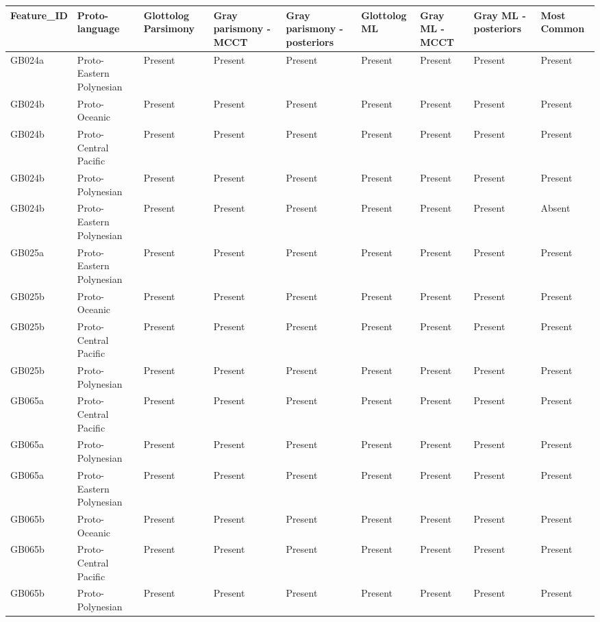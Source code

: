 \begin{longtable}{p{1.5cm}p{2.5cm}p{2.5cm}p{2.5cm}p{2.5cm}p{2.5cm}p{2.5cm}p{2.5cm}p{2.5cm}}
  \toprule
Feature\_ID & Proto-language & Glottolog Parsimony & Gray parismony -MCCT & Gray parismony -posteriors & Glottolog ML & Gray ML -MCCT & Gray ML -posteriors & Most Common \\ 
  \midrule
GB024a & Proto-Eastern Polynesian & Present & Present & Present & Present & Present & Present & Present \\ 
  GB024b & Proto-Oceanic & Present & Present & Present & Present & Present & Present & Present \\ 
  GB024b & Proto-Central Pacific & Present & Present & Present & Present & Present & Present & Present \\ 
  GB024b & Proto-Polynesian & Present & Present & Present & Present & Present & Present & Present \\ 
  GB024b & Proto-Eastern Polynesian & Present & Present & Present & Present & Present & Present & Absent \\ 
  GB025a & Proto-Eastern Polynesian & Present & Present & Present & Present & Present & Present & Present \\ 
  GB025b & Proto-Oceanic & Present & Present & Present & Present & Present & Present & Present \\ 
  GB025b & Proto-Central Pacific & Present & Present & Present & Present & Present & Present & Present \\ 
  GB025b & Proto-Polynesian & Present & Present & Present & Present & Present & Present & Present \\ 
  GB065a & Proto-Central Pacific & Present & Present & Present & Present & Present & Present & Present \\ 
  GB065a & Proto-Polynesian & Present & Present & Present & Present & Present & Present & Present \\ 
  GB065a & Proto-Eastern Polynesian & Present & Present & Present & Present & Present & Present & Present \\ 
  GB065b & Proto-Oceanic & Present & Present & Present & Present & Present & Present & Present \\ 
  GB065b & Proto-Central Pacific & Present & Present & Present & Present & Present & Present & Present \\ 
  GB065b & Proto-Polynesian & Present & Present & Present & Present & Present & Present & Present \\ 

\end{longtable}
